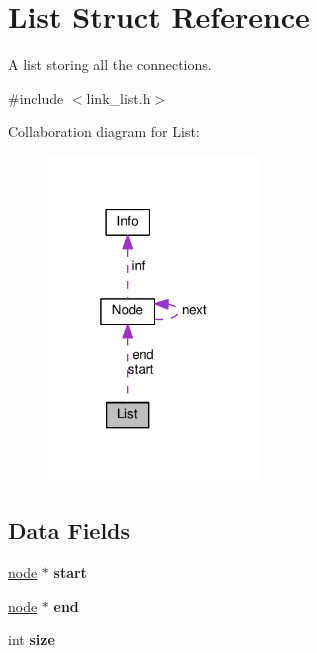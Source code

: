 \hypertarget{struct_list}{\section{List Struct Reference}
\label{struct_list}
}


A list storing all the connections.  




{\ttfamily \#include $<$link\+\_\+list.\+h$>$}



Collaboration diagram for List\+:\nopagebreak
\begin{figure}[H]
\begin{center}
\leavevmode
\includegraphics[width=160pt]{struct_list__coll__graph}
\end{center}
\end{figure}
\subsection*{Data Fields}
\begin{DoxyCompactItemize}
\item 
\hypertarget{struct_list_a6a771a8ed404bc96256d21e69e4fc00a}{\hyperlink{link__list_8h_a682f531e759e6edca2fba6c56a0b6298}{node} $\ast$ {\bfseries start}}\label{struct_list_a6a771a8ed404bc96256d21e69e4fc00a}

\item 
\hypertarget{struct_list_abb9fbdc23146cffbf0092baefefdb8b6}{\hyperlink{link__list_8h_a682f531e759e6edca2fba6c56a0b6298}{node} $\ast$ {\bfseries end}}\label{struct_list_abb9fbdc23146cffbf0092baefefdb8b6}

\item 
\hypertarget{struct_list_a439227feff9d7f55384e8780cfc2eb82}{int {\bfseries size}}\label{struct_list_a439227feff9d7f55384e8780cfc2eb82}

\end{DoxyCompactItemize}


